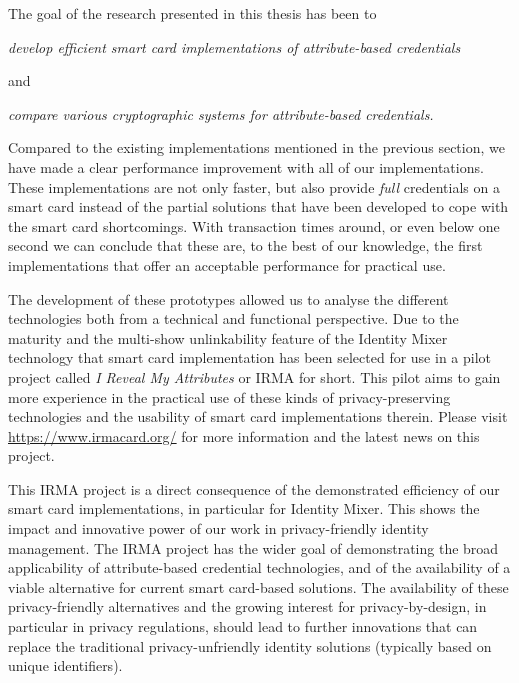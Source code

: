 The goal of the research presented in this thesis has been to
\begin{center}\it
  develop efficient smart card implementations of attribute-based credentials
\end{center}
and
\begin{center}\it
  compare various cryptographic systems for attribute-based credentials.
\end{center}

Compared to the existing implementations mentioned in the previous section, we
have made a clear performance improvement with all of our implementations. These
implementations are not only faster, but also provide \emph{full} credentials
on a smart card instead of the partial solutions that have been developed to
cope with the smart card shortcomings. With transaction times around, or even
below one second we can conclude that these are, to the best of our knowledge,
the first implementations that offer an acceptable performance for practical
use.

The development of these prototypes allowed us to analyse the different
technologies both from a technical and functional perspective. Due to the
maturity and the multi-show unlinkability feature of the Identity Mixer
 technology that smart card implementation has been
selected for use in a pilot project called \emph{I Reveal My Attributes} or
IRMA  for short. This pilot aims to gain more experience in
the practical use of these kinds of privacy-preserving technologies and the
usability of smart card implementations therein. Please visit
\url{https://www.irmacard.org/} for more information and the latest news
on this project.


This IRMA project is a direct consequence of the demonstrated efficiency of our
smart card implementations, in particular for Identity Mixer. This shows the
impact and innovative power of our work in privacy-friendly identity management.
The IRMA project has the wider goal of demonstrating the broad applicability of
attribute-based credential technologies, and of the availability of a viable
alternative for current smart card-based solutions.
The availability of these privacy-friendly alternatives and the growing interest
for privacy-by-design, in particular in privacy regulations, should lead to
further innovations that can replace the traditional privacy-unfriendly identity
solutions (typically based on unique identifiers).
